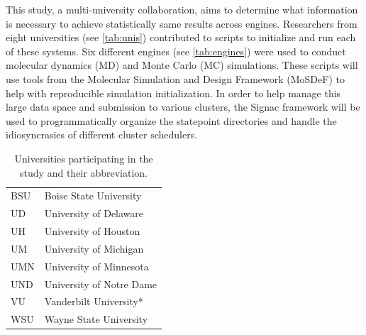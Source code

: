 
This study, a multi-university collaboration, aims to determine what information is necessary to achieve statistically same results across engines.
Researchers from eight universities (see \autoref{tab:unis}) contributed to scripts to initialize and run each of these systems.
Six different engines (see \autoref{tab:engines}) were used to conduct molecular dynamics (MD) and Monte Carlo (MC) simulations.
These scripts will use tools from the Molecular Simulation and Design Framework (MoSDeF) to help with reproducible simulation initialization.
In order to help manage this large data space and submission to various clusters, the Signac framework will be used to programmatically organize the statepoint directories and handle the idiosyncrasies of different cluster schedulers.

\begin{table}
\caption{Universities participating in the study and their abbreviation.}\label{tab:unis}
\centering
\begin{tabular}{ll}
BSU & Boise State University \\
UD & University of Delaware \\
UH & University of Houston \\
UM & University of Michigan \\
UMN & University of Minnesota \\
UND & University of Notre Dame \\
VU & Vanderbilt University* \\
WSU & Wayne State University
\end{tabular}
\end{table}

